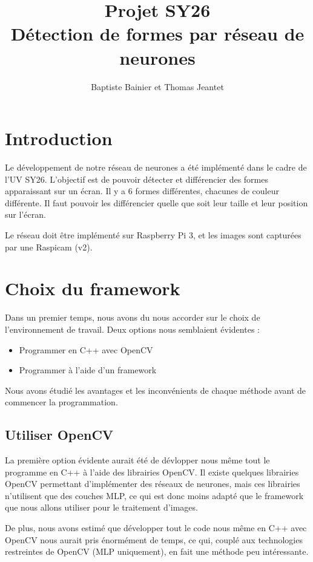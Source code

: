 \documentclass[a4paper,12pt]{article}
\author{Baptiste Bainier et Thomas Jeantet}
\title{Projet SY26\\Détection de formes par réseau de neurones}
\begin{document}
\maketitle
\newpage
\newpage


\section*{Introduction}
  Le développement de notre réseau de neurones a été implémenté dans le cadre de l'UV SY26. L'objectif est de pouvoir détecter et différencier des formes apparaissant sur un écran. Il y a 6 formes différentes, chacunes de couleur différente. Il faut pouvoir les différencier quelle que soit leur taille et leur position sur l'écran.

  Le réseau doit être implémenté sur Raspberry Pi 3, et les images sont capturées par une Raspicam (v2).
\bigskip
\tableofcontents

\newpage
\section{Choix du framework}
  Dans un premier temps, nous avons du nous accorder sur le choix de l'environnement de travail. Deux options nous semblaient évidentes : 
  \begin{itemize}
    \item Programmer en C++ avec OpenCV
    \item Programmer à l'aide d'un framework
  \end{itemize}
  Nous avons étudié les avantages et les inconvénients de chaque méthode avant de commencer la programmation.
  
  \subsection{Utiliser OpenCV}
    La première option évidente aurait été de dévlopper nous même tout le programme en C++ à l'aide des librairies OpenCV. Il existe quelques librairies OpenCV permettant d'implémenter des réseaux de neurones, mais ces librairies n'utilisent que des couches MLP, ce qui est donc moins adapté que le framework que nous allons utiliser pour le traitement d'images.

    De plus, nous avons estimé que développer tout le code nous même en C++ avec OpenCV nous aurait pris énormément de temps, ce qui, couplé aux technologies restreintes de OpenCV (MLP uniquement), en fait une méthode peu intéressante.
  
\end{document}
